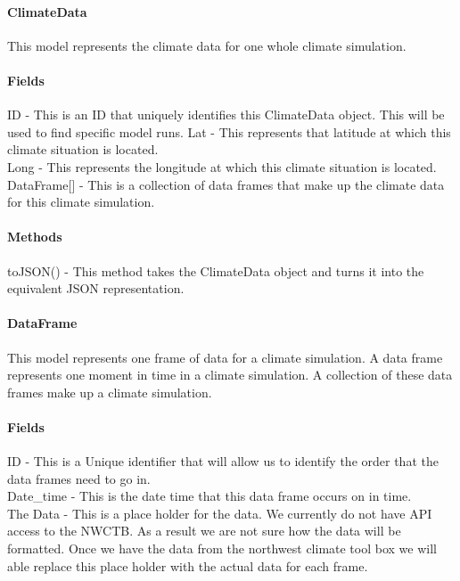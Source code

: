 \documentclass[onecolumn, draftclsnofoot,10pt, compsoc]{article}
\begin{document}
			\paragraph{\textbf{ClimateData}}
				This model represents the climate data for one whole climate simulation.\\
			\paragraph{\textbf{Fields}}
			ID - This is an ID that uniquely identifies this ClimateData object. This will be used to find specific model runs.
			Lat - This represents that latitude at which this climate situation is located.\\
			Long - This represents the longitude at which this climate situation is located.\\
			DataFrame[] - This is a collection of data frames that make up the climate data for this climate simulation.\\

			\paragraph{\textbf{Methods}}
			toJSON() - This method takes the ClimateData object and turns it into the equivalent JSON representation.\\

			\paragraph{\textbf{DataFrame}}
				This model represents one frame of data for a climate simulation. A data frame represents one moment in time in a climate simulation. A collection of these data frames make up a climate simulation.\\

			\paragraph{\textbf{Fields}}
			ID - This is a Unique identifier that will allow us to identify the order that the data frames need to go in.\\
			Date\_time - This is the date time that this data frame occurs on in time.\\
			The Data - This is a place holder for the data. We currently do not have API access to the NWCTB. As a result we are not sure how the data will be formatted. Once we have the data from the northwest climate tool box we will able replace this place holder with the actual data for each frame.\\
\end{document}

